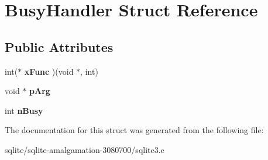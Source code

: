 \hypertarget{struct_busy_handler}{\section{Busy\+Handler Struct Reference}
\label{struct_busy_handler}
}
\subsection*{Public Attributes}
\begin{DoxyCompactItemize}
\item 
\hypertarget{struct_busy_handler_aafc84c4e4934de2d5bdf02f268e9340f}{int($\ast$ {\bfseries x\+Func} )(void $\ast$, int)}\label{struct_busy_handler_aafc84c4e4934de2d5bdf02f268e9340f}

\item 
\hypertarget{struct_busy_handler_a1c793d2b815e79cf3684de46847551bd}{void $\ast$ {\bfseries p\+Arg}}\label{struct_busy_handler_a1c793d2b815e79cf3684de46847551bd}

\item 
\hypertarget{struct_busy_handler_aac4531c677ed5ae9e4757ca1b02c568b}{int {\bfseries n\+Busy}}\label{struct_busy_handler_aac4531c677ed5ae9e4757ca1b02c568b}

\end{DoxyCompactItemize}


The documentation for this struct was generated from the following file\+:\begin{DoxyCompactItemize}
\item 
sqlite/sqlite-\/amalgamation-\/3080700/sqlite3.\+c\end{DoxyCompactItemize}
